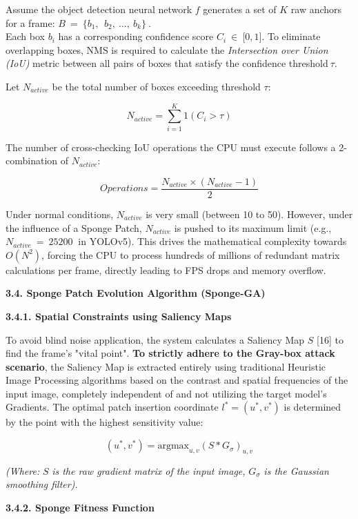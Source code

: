 \documentclass[]{article}
\begin{document}
Assume the object detection neural network \(f\) generates a set of \(K\) raw anchors for a frame:
\(B\  = \ \{ b_{1},\ \ b_{2},\ ...,\ b_{k}\}\ .\)\\
Each box \(b_{i}\) has a corresponding confidence score \(C_{i}\  \in \ \lbrack 0,1\rbrack\). To eliminate overlapping boxes, NMS is required to calculate the \emph{Intersection over Union (IoU)} metric between all pairs of boxes that satisfy the confidence threshold\(\ \tau\).

Let \(N_{active}\) be the total number of boxes exceeding threshold \(\tau\):

\[N_{active} = \sum_{i = 1}^{K}1\left( C_{i} > \tau \right)\]

The number of cross-checking IoU operations the CPU must execute follows a 2-combination of \(N_{active}\):

\[Operations = \frac{N_{active} \times \left( N_{active} - 1 \right)}{2}\]

Under normal conditions, \(N_{active}\) is very small (between 10 to 50). However, under the influence of a Sponge Patch, \(N_{active}\) is pushed to its maximum limit (e.g., \(N_{active}\  = \ 25200\ \) in YOLOv5). This drives the mathematical complexity towards \(O(N^{2})\), forcing the CPU to process hundreds of millions of redundant matrix calculations per frame, directly leading to FPS drops and memory overflow.

\textbf{3.4. Sponge Patch Evolution Algorithm (Sponge-GA)}

\textbf{3.4.1. Spatial Constraints using Saliency Maps}

To avoid blind noise application, the system calculates a Saliency Map \(S\) {[}16{]} to find the frame's "vital point". \textbf{To strictly adhere to the Gray-box attack scenario}, the Saliency Map is extracted entirely using traditional Heuristic Image Processing algorithms based on the contrast and spatial frequencies of the input image, completely independent of and not utilizing the target model's Gradients. The optimal patch insertion coordinate \(l^{*} = \left( u^{*},v^{*} \right)\) is determined by the point with the highest sensitivity value:

\[\left( u^{*},v^{*} \right) = \text{argmax}_{u,v}\left( S*G_{\sigma} \right)_{u,v}\]

\emph{(Where:} \(S\) \emph{is the raw gradient matrix of the input image,} \(G_{\sigma}\) \emph{is the Gaussian smoothing filter).}

\textbf{3.4.2. Sponge Fitness Function}
\end{document}
